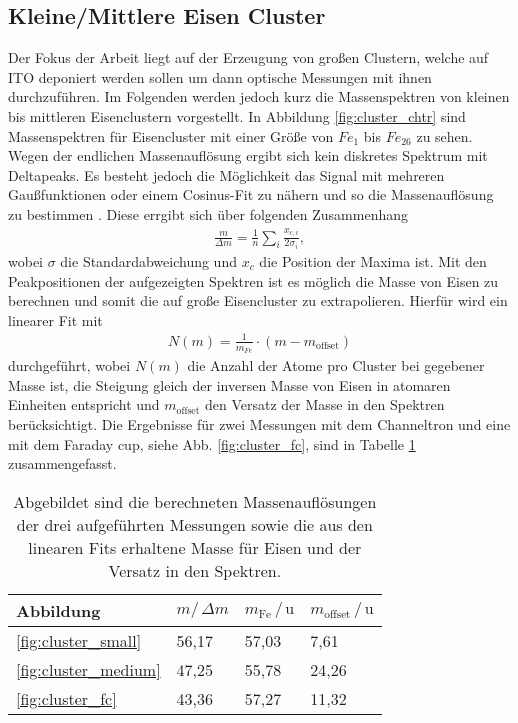 \subsection{Kleine/Mittlere Eisen Cluster}
Der Fokus der Arbeit liegt auf der Erzeugung von großen Clustern, welche auf ITO deponiert werden sollen um dann optische Messungen mit ihnen durchzuführen.
Im Folgenden werden jedoch kurz die Massenspektren von kleinen bis mittleren Eisenclustern vorgestellt.
In Abbildung \ref{fig:cluster_chtr} sind Massenspektren für Eisencluster mit einer Größe von $Fe_{1}$ bis $Fe_{26}$ zu sehen.
Wegen der endlichen Massenauflösung ergibt sich kein diskretes Spektrum mit Deltapeaks.
Es besteht jedoch die Möglichkeit das Signal mit mehreren Gaußfunktionen oder einem Cosinus-Fit zu nähern und so die Massenauflösung zu bestimmen \cite[S. 94 ff.]{krause}.
Diese errgibt sich über folgenden Zusammenhang
\begin{align}
  \frac{m}{\Delta m} = \frac{1}{n} \sum\limits_{i} \frac{x_{c,i}}{2 \sigma_i},
\end{align}
wobei $\sigma$ die Standardabweichung und $x_c$ die Position der Maxima ist.
Mit den Peakpositionen der aufgezeigten Spektren ist es möglich die Masse von Eisen zu berechnen und somit die auf große Eisencluster zu extrapolieren.
Hierfür wird ein linearer Fit mit
\begin{align}
  N\left(m\right) = \frac{1}{m_{Fe}} \cdot \left(m-m_{\text{offset}}\right)
\end{align}
durchgeführt, wobei $N\left(m\right)$ die Anzahl der Atome pro Cluster bei gegebener Masse ist, die Steigung gleich der inversen Masse von Eisen in atomaren Einheiten entspricht und $m_{\text{offset}}$ den Versatz der Masse in den Spektren berücksichtigt.
Die Ergebnisse für zwei Messungen mit dem Channeltron und eine mit dem Faraday cup, siehe Abb. \ref{fig:cluster_fc}, sind in Tabelle \ref{tab:msfitdata} zusammengefasst.

\begin{table}
  \centering
  \caption{Abgebildet sind die berechneten Massenauflösungen der drei aufgeführten Messungen sowie die aus den linearen Fits erhaltene Masse für Eisen und der Versatz in den Spektren.}
  \label{tab:msfitdata}
  \begin{tabular}{llll}
      \toprule
      Abbildung	&	$m/\,\Delta m $	&	$m_\text{Fe}\,/\,\text{u}$	&	$m_\text{offset}\,/\,\text{u}$	\\
      \midrule
      \ref{fig:cluster_small}	&	56,17	&	57,03	&	7,61	\\
      \ref{fig:cluster_medium}	&	47,25	&	55,78	&	24,26	\\
      \ref{fig:cluster_fc}	&	43,36	&	57,27	&	11,32	\\

      \bottomrule
  \end{tabular}
\end{table}

